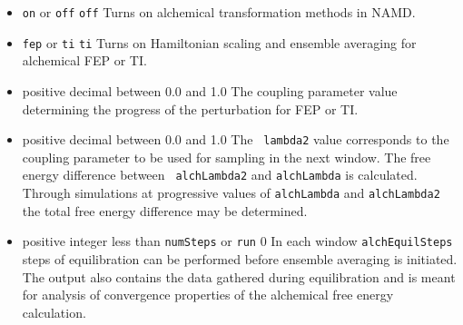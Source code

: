 \begin{itemize}
\item
{} {{\tt on} or {\tt off}} {{\tt off}} {Turns on alchemical transformation methods in NAMD.}

\item
{} {{\tt fep} or {\tt ti}} {{\tt ti}} 
{Turns on Hamiltonian scaling and ensemble averaging for alchemical FEP or TI.}


\item
{} {positive
decimal between 0.0 and 1.0} {The coupling parameter value determining the
progress of the perturbation for FEP or TI.}

\item
{} {positive decimal between 0.0 and 1.0} {The {\tt
lambda2} value corresponds to the coupling parameter to be used for
sampling in the next window.  The free energy difference between {\tt
alchLambda2} and {\tt alchLambda} is calculated.  Through simulations
at progressive values of {\tt alchLambda} and {\tt alchLambda2} the
total free energy difference may be determined. }


\item
{}
{positive integer less than {\tt numSteps} or {\tt run}}
{0}
{In each window {\tt alchEquilSteps} steps of equilibration can be
performed before ensemble averaging is initiated. The output also contains
the data gathered during equilibration and is meant for analysis of
convergence properties of the alchemical free energy calculation.}


\end{itemize}
